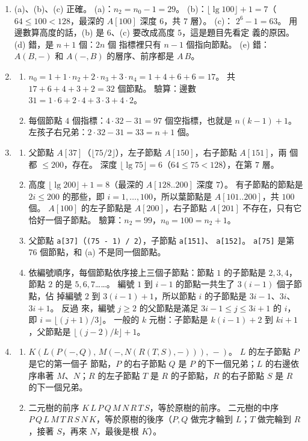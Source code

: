 \begin{enumerate}
\item (a)、(b)、(c) 正確。 (a)：$n_2 = n_0 - 1 = 29$。 (b)：$\lfloor \lg 100 \rfloor
+ 1 = 7$（$64 \le 100 < 128$，最深的 $A[100]$ 深度 $6$，共 $7$ 層）。 (c)：
$2^6 - 1 = 63$。 用邊數算高度的話，(b) 是 $6$、(c) 要改成高度 $5$，這是題目先看定
義的原因。 (d) 錯，是 $n + 1$ 個：$2n$ 個
指標裡只有 $n - 1$ 個指向節點。 (e) 錯：$A(B, -)$ 和 $A(-, B)$ 的層序、前序都是
$A\,B$。

\item
\begin{enumerate}
\item $n_0 = 1 + 1 \cdot n_2 + 2 \cdot n_3 + 3 \cdot n_4 = 1 + 4 + 6 + 6 = 17$。 共
$17 + 6 + 4 + 3 + 2 = 32$ 個節點。 驗算：邊數 $31 = 1 \cdot 6 + 2 \cdot 4 + 3 \cdot 3
+ 4 \cdot 2$。
\item 每個節點 $4$ 個指標：$4 \cdot 32 - 31 = 97$ 個空指標，也就是 $n(k - 1) + 1$。
左孩子右兄弟：$2 \cdot 32 - 31 = 33 = n + 1$ 個。
\end{enumerate}

\item
\begin{enumerate}
\item 父節點 $A[37]$（$\lfloor 75/2 \rfloor$），左子節點 $A[150]$，右子節點 $A[151]$，兩
個都 $\le 200$，存在。 深度 $\lfloor \lg 75 \rfloor = 6$（$64 \le 75 < 128$），在第
$7$ 層。
\item 高度 $\lfloor \lg 200 \rfloor + 1 = 8$（最深的 $A[128..200]$ 深度 $7$）。 有子節點的節點是 $2i \le 200$ 的那些，即
$i = 1, \ldots, 100$，所以葉節點是 $A[101..200]$，共 $100$ 個。 $A[100]$ 的左子節點是
$A[200]$，右子節點 $A[201]$ 不存在，只有它恰好一個子節點。 驗算：$n_2 = 99$，$n_0 = 100
= n_2 + 1$。
\item 父節點 \texttt{a[37]}（\texttt{(75 - 1) / 2}），子節點 \texttt{a[151]}、
\texttt{a[152]}。 \texttt{a[75]} 是第 $76$ 個節點，和 (a) 不是同一個節點。
\item 依編號順序，每個節點依序接上三個子節點：節點 $1$ 的子節點是 $2, 3, 4$，節點
$2$ 的是 $5, 6, 7$……。 編號 $1$ 到 $i - 1$ 的節點一共生了 $3(i - 1)$ 個子節點，佔
掉編號 $2$ 到 $3(i - 1) + 1$，所以節點 $i$ 的子節點是 $3i - 1$、$3i$、$3i + 1$。 反過
來，編號 $j \ge 2$ 的父節點是滿足 $3i - 1 \le j \le 3i + 1$ 的 $i$，即
$i = \lfloor (j + 1)/3 \rfloor$。 一般的 $k$ 元樹：子節點是 $k(i - 1) + 2$ 到
$ki + 1$，父節點是 $\lfloor (j - 2)/k \rfloor + 1$。
\end{enumerate}

\item
\begin{enumerate}
\item $K(L(P(-, Q),\, M(-, N(R(T, S), -))),\, -)$。 $L$ 的左子節點 $P$ 是它的第一個子
節點，$P$ 的右子節點 $Q$ 是 $P$ 的下一個兄弟；$L$ 的右邊依序串著 $M$、$N$；$R$ 的左子節點 $T$ 是
$R$ 的子節點，$R$ 的右子節點 $S$ 是 $R$ 的下一個兄弟。
\item 二元樹的前序 $K\,L\,P\,Q\,M\,N\,R\,T\,S$，等於原樹的前序。 二元樹的中序
$P\,Q\,L\,M\,T\,R\,S\,N\,K$，等於原樹的後序（$P, Q$ 做完才輪到 $L$；$T$ 做完輪到
$R$，接著 $S$，再來 $N$，最後是根 $K$）。
\end{enumerate}


\end{enumerate}
